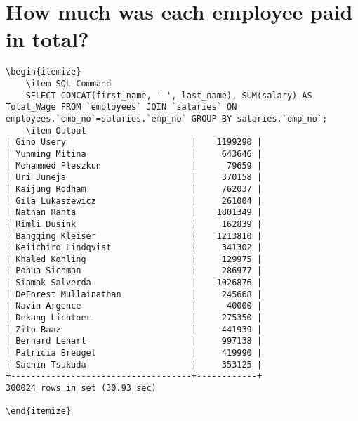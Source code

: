 \documentclass[13pt,a4paper]{report}
\begin{document}
\section{ How much was each employee paid in total? }
\begin{lstlisting}
\begin{itemize}
	\item SQL Command
	SELECT CONCAT(first_name, ' ', last_name), SUM(salary) AS Total_Wage FROM `employees` JOIN `salaries` ON employees.`emp_no`=salaries.`emp_no` GROUP BY salaries.`emp_no`;
	\item Output
| Gino Usery                         |    1199290 |
| Yunming Mitina                     |     643646 |
| Mohammed Pleszkun                  |      79659 |
| Uri Juneja                         |     370158 |
| Kaijung Rodham                     |     762037 |
| Gila Lukaszewicz                   |     261004 |
| Nathan Ranta                       |    1801349 |
| Rimli Dusink                       |     162839 |
| Bangqing Kleiser                   |    1213810 |
| Keiichiro Lindqvist                |     341302 |
| Khaled Kohling                     |     129975 |
| Pohua Sichman                      |     286977 |
| Siamak Salverda                    |    1026876 |
| DeForest Mullainathan              |     245668 |
| Navin Argence                      |      40000 |
| Dekang Lichtner                    |     275350 |
| Zito Baaz                          |     441939 |
| Berhard Lenart                     |     997138 |
| Patricia Breugel                   |     419990 |
| Sachin Tsukuda                     |     353125 |
+------------------------------------+------------+
300024 rows in set (30.93 sec)

\end{itemize}
\end{lstlisting}
\end{document}
